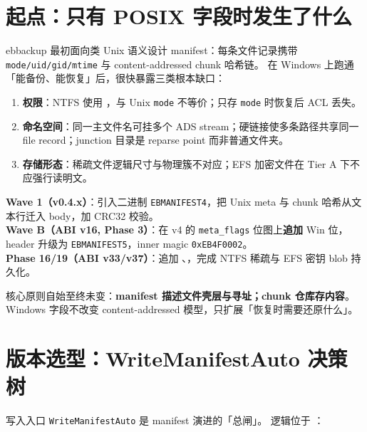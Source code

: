 
\section{起点：只有 POSIX 字段时发生了什么}

ebbackup 最初面向类 Unix 语义设计 manifest：每条文件记录携带 \texttt{mode/uid/gid/mtime} 与 content-addressed chunk 哈希链。
在 Windows 上跑通「能备份、能恢复」后，很快暴露三类根本缺口：

\begin{enumerate}[nosep]
  \item \textbf{权限}：NTFS 使用 ，与 Unix \texttt{mode} 不等价；只存 \texttt{mode} 时恢复后 ACL 丢失。
  \item \textbf{命名空间}：同一主文件名可挂多个 ADS stream；硬链接使多条路径共享同一 file record；junction 目录是 reparse point 而非普通文件夹。
  \item \textbf{存储形态}：稀疏文件逻辑尺寸与物理簇不对应；EFS 加密文件在 Tier A 下不应强行读明文。
\end{enumerate}

\begin{evolbox}
\textbf{Wave 1（v0.4.x）}：引入二进制 \texttt{EBMANIFEST4}，把 Unix meta 与 chunk 哈希从文本行迁入 body，加 CRC32 校验。\\
\textbf{Wave B（ABI v16, Phase 3）}：在 v4 的 \texttt{meta\_flags} 位图上\textbf{追加} Win 位，header 升级为 \texttt{EBMANIFEST5}，inner magic \texttt{0xEB4F0002}。\\
\textbf{Phase 16/19（ABI v33/v37）}：追加 、，完成 NTFS 稀疏与 EFS 密钥 blob 持久化。
\end{evolbox}

核心原则自始至终未变：\textbf{manifest 描述文件壳层与寻址；chunk 仓库存内容}。Windows 字段不改变 content-addressed 模型，只扩展「恢复时需要还原什么」。

\section{版本选型：WriteManifestAuto 决策树}

写入入口 \texttt{WriteManifestAuto} 是 manifest 演进的「总闸」。
逻辑位于 ：

